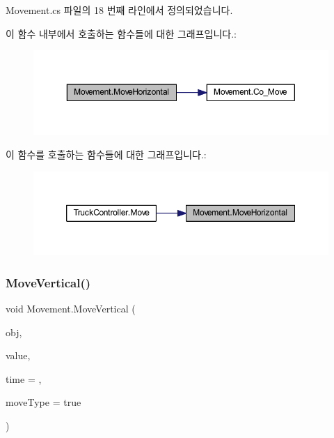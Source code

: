 Movement.\+cs 파일의 18 번째 라인에서 정의되었습니다.


\begin{DoxyCode}{0}

\end{DoxyCode}
이 함수 내부에서 호출하는 함수들에 대한 그래프입니다.\+:\nopagebreak
\begin{figure}[H]
\begin{center}
\leavevmode
\includegraphics[width=350pt]{d1/de2/class_movement_a35adeccf74f9c659ac5c15f6ef239919_cgraph}
\end{center}
\end{figure}
이 함수를 호출하는 함수들에 대한 그래프입니다.\+:\nopagebreak
\begin{figure}[H]
\begin{center}
\leavevmode
\includegraphics[width=350pt]{d1/de2/class_movement_a35adeccf74f9c659ac5c15f6ef239919_icgraph}
\end{center}
\end{figure}
\mbox{\label{class_movement_a2984f510496fd8a5df663ad68e0fab17}} 
\subsubsection{\texorpdfstring{MoveVertical()}{MoveVertical()}}
{\footnotesize\ttfamily void Movement.\+Move\+Vertical (\begin{DoxyParamCaption}\item[{Game\+Object}]{obj,  }\item[{float}]{value,  }\item[{float}]{time = {},  }\item[{bool}]{move\+Type = {\ttfamily true} }\end{DoxyParamCaption})}



